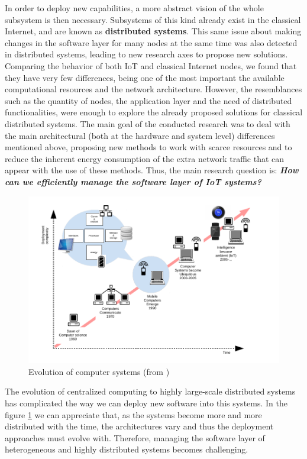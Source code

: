 In order to deploy new capabilities, a more abstract vision of the whole subsystem is then necessary.
Subsystems of this kind already exist in the classical Internet, and are known as \textbf{distributed systems}\cite{coulouris2005distributed}.
This same issue about making changes in the software layer for many nodes at the same time was also detected in distributed systems, leading to new research axes to propose new solutions.
Comparing the behavior of both IoT and classical Internet nodes, we found that they have very few differences, being one of the most important the available computational resources and the network architecture.
However, the resemblances such as the quantity of nodes, the application layer and the need of distributed functionalities, were enough to explore the already proposed solutions for classical distributed systems.
The main goal of the conducted research was to deal with the main architectural (both at the hardware and system level) differences mentioned above, proposing new methods to work with scarce resources and to reduce the inherent energy consumption of the extra network traffic that can appear with the use of these methods.
Thus, the main research question is: \textit{\textbf{How can we efficiently manage the software layer of IoT systems?}}

\begin{figure}[htb]
	\centering
	\includegraphics[width=1\columnwidth]{chapters/background.images/evolutionCompSys.pdf}
	\caption{Evolution of computer systems (from \cite{waldner2007nano})}
	\label{fig:EvolCompSyst}
\end{figure}

The evolution of centralized computing to highly large-scale distributed systems has complicated the way we can deploy new software into this systems.
In the figure \ref{fig:EvolCompSyst} we can appreciate that, as the systems become more and more distributed with the time, the architectures vary and thus the deployment approaches must evolve with.
Therefore, managing the software layer of heterogeneous and highly distributed systems becomes challenging.

